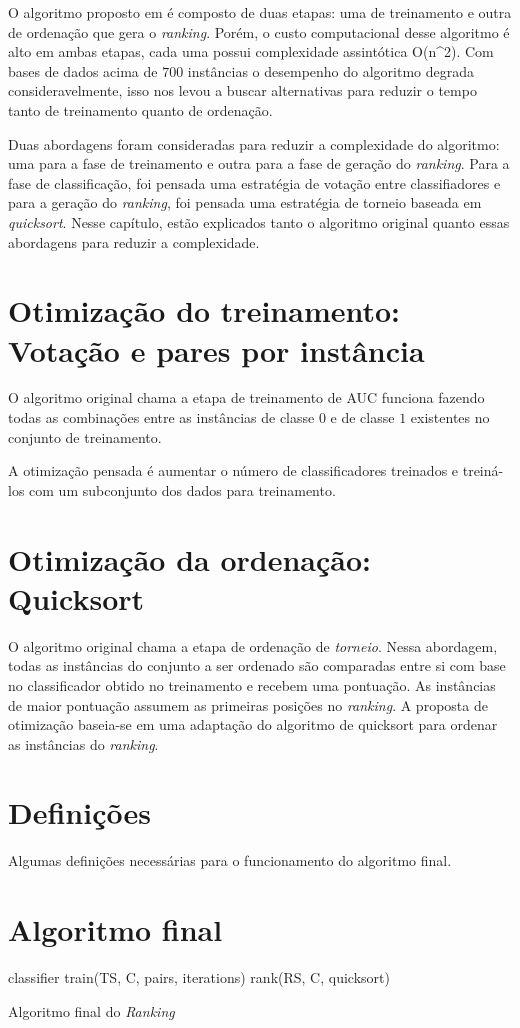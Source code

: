 O algoritmo proposto em \cite{langford08} é composto de duas etapas: uma de treinamento e outra de ordenação que gera o \emph{ranking}. Porém, o custo computacional desse algoritmo é alto em ambas etapas, cada uma possui complexidade assintótica O(n^2). Com bases de dados acima de $700$ instâncias o desempenho do algoritmo degrada consideravelmente, isso nos levou a buscar alternativas para reduzir o tempo tanto de treinamento quanto de ordenação.

Duas abordagens foram consideradas para reduzir a complexidade do algoritmo: uma para a fase de treinamento e outra para a fase de geração do \emph{ranking}. Para a fase de classificação, foi pensada uma estratégia de votação entre classifiadores e para a geração do \emph{ranking}, foi pensada uma estratégia de torneio baseada em \emph{quicksort}. Nesse capítulo, estão explicados tanto o algoritmo original quanto essas abordagens para reduzir a complexidade.

\section{Otimização do treinamento: Votação e pares por instância}
O algoritmo original chama a etapa de treinamento de AUC funciona fazendo todas as combinações entre as instâncias de classe $0$ e de classe $1$ existentes no conjunto de treinamento.

A otimização pensada é aumentar o número de classificadores treinados e treiná-los com um subconjunto dos dados para treinamento.

\section{Otimização da ordenação: Quicksort}
O algoritmo original chama a etapa de ordenação de \emph{torneio}. Nessa abordagem, todas as instâncias do conjunto a ser ordenado são comparadas entre si com base no classificador obtido no treinamento e recebem uma pontuação. As instâncias de maior pontuação assumem as primeiras posições no \emph{ranking}. A proposta de otimização baseia-se em uma adaptação do algoritmo de quicksort para ordenar as instâncias do \emph{ranking}.

\section{Definições}
Algumas definições necessárias para o funcionamento do algoritmo final.

\section{Algoritmo final}

\begin{algorithm}
\begin{algorithmic}

\STATE classifier \gets train(TS, C, pairs, iterations)
\STATE rank(RS, C, quicksort)

\caption{Algoritmo final do \emph{Ranking}}
\label{alg:ranking}

\end{algorithmic}
\end{algorithm}
